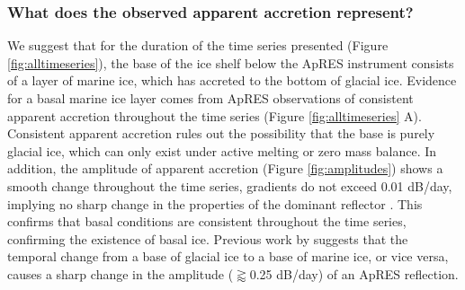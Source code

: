 \subsubsection{What does the observed apparent accretion represent?}


We suggest that for the duration of the time series presented (Figure \ref{fig:alltimeseries}), the base of the ice shelf below the ApRES instrument consists of a layer of marine ice, which has accreted to the bottom of glacial ice. Evidence for a basal marine ice layer comes from ApRES observations of consistent apparent accretion throughout the time series (Figure \ref{fig:alltimeseries} A). Consistent apparent accretion rules out the possibility that the base is purely glacial ice, which can only exist under active melting or zero mass balance.
In addition, the amplitude of apparent accretion (Figure \ref{fig:amplitudes}) shows a smooth change throughout the time series, gradients do not exceed 0.01 dB/day, implying no sharp change in the properties of the dominant reflector  \citep{vavnkova2021nature}. This confirms that basal conditions are consistent throughout the time series, confirming the existence of basal ice. Previous work by \cite{vavnkova2021nature} suggests that the temporal change from a base of glacial ice to a base of marine ice, or vice versa, causes a sharp change in the amplitude ($\gtrapprox$0.25 dB/day) of an ApRES reflection. 

